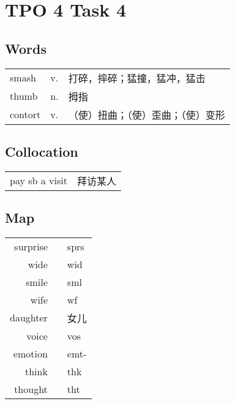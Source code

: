 \section{TPO 4 Task 4}

\subsection{Words}

\begin{tabular}{lll}
    smash   & v. & 打碎，摔碎；猛撞，猛冲，猛击    \\
    thumb   & n. & 拇指                \\
    contort & v. & （使）扭曲；（使）歪曲；（使）变形 \\
\end{tabular}

\subsection{Collocation}

\begin{tabular}{ll}
    pay sb a visit & 拜访某人 \\
\end{tabular}

\subsection{Map}

\begin{tabular}{rc@{\quad$\to$\quad}l}
    surprise &  & sprs \\
    wide     &  & wid  \\
    smile    &  & sml  \\
    wife     &  & wf   \\
    daughter &  & 女儿   \\
    voice    &  & vos  \\
    emotion  &  & emt- \\
    think    &  & thk  \\
    thought  &  & tht  \\
\end{tabular}

\newpage
